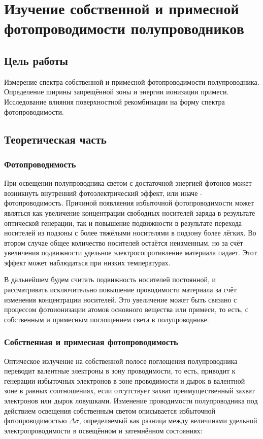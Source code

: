 \chapter{Изучение собственной и примесной фотопроводимости полупроводников}

\section{Цель работы}
Измерение спектра собственной и примесной фотопроводимости полупроводника. Определение ширины запрещённой зоны и энергии ионизации примеси. Исследование влияния поверхностной рекомбинации на форму спектра фотопроводимости.

\section{Теоретическая часть}
\subsection{Фотопроводимость}
При освещении полупроводника светом с достаточной энергией фотонов может возникнуть внутренний фотоэлектрический эффект, или иначе - фотопроводимость. Причиной появляения  избыточной фотопроводимости может являться как увеличение концентрации свободных носителей заряда в результате оптической генерации, так и повышение подвижности в результате перехода носителей из подзоны с более тяжёлыми носителями в подзону более лёгких. Во втором случае общее количество носителей остаётся неизменным, но за счёт увеличения подвижности удельное электросопротивление материала падает. Этот эффект может наблюдаться при низких температурах.

В дальнейшем будем считать подвижность носителей постоянной, и рассматривать исключительно повышение проводимости материала за счёт изменения концентрации носителей. Это увеличение может быть связано с процессом фотоионизации атомов основного вещества или примеси, то есть, с собственным и примесным поглощением света в полупроводнике.

\subsection{Собственная и примесная фотопроводимость}
Оптическое излучение на собственной полосе поглощения полупроводника переводит валентные электроны в зону проводимости, то есть, приводит к генерации избыточных электронов в зоне проводимости и дырок в валентной зоне в равных соотношениях, если отсутствует захват преимущественный захват электронов или дырок ловушками.
Изменение проводимости полупроводника под действием освещения собственным светом описывается избыточной фотопроводимостью $\Delta \sigma$, определяемый как разница между величинами удельной электропроводимости в освещённом и затемнённом состояниях:

